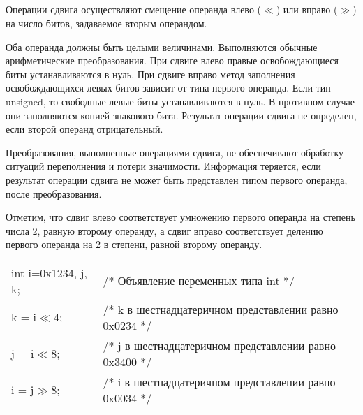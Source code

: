 \subsection{}

Операции сдвига осуществляют смещение операнда влево ($\ll$) или вправо ($\gg$) на число битов, задаваемое вторым операндом. \killoverfullbefore

Оба операнда должны быть целыми величинами. Выполняются обычные арифметические преобразования. При сдвиге влево правые освобождающиеся биты устанавливаются в нуль. При сдвиге вправо метод заполнения освобождающихся левых битов зависит от типа первого операнда. Если тип unsigned, то свободные левые биты устанавливаются в нуль. В противном случае они заполняются копией знакового бита. Результат операции сдвига не определен, если второй операнд отрицательный. \killoverfullbefore

Преобразования, выполненные операциями сдвига, не обеспечивают обработку ситуаций переполнения и потери значимости. Информация теряется, если результат операции сдвига не может быть представлен типом первого операнда, после преобразования. \killoverfullbefore

Отметим, что сдвиг влево соответствует умножению первого операнда на степень числа 2, равную второму операнду, а сдвиг вправо соответствует делению первого операнда на 2 в степени, равной второму операнду. \killoverfullbefore \BL

\begin{pExample}
\begin{tabular}{ l l }
int  i=0x1234, j,  k; & \textcolor{exComm}{/* Объявление переменных типа int */} \\
k = i$\ll$4; & \textcolor{exComm}{/* k в шестнадцатеричном представлении равно 0x0234 */} \\
j = i$\ll$8; & \textcolor{exComm}{/* j в шестнадцатеричном представлении равно 0x3400 */} \\
i = j$\gg$8;  & \textcolor{exComm}{/* i в шестнадцатеричном представлении равно 0x0034 */} \\
\end{tabular}
\end{pExample}

\subsection{}

